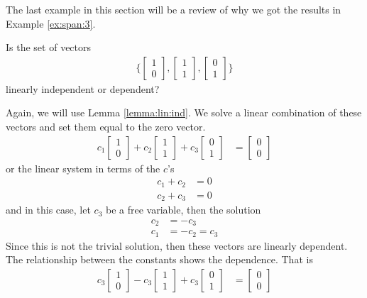 The last example in this section will be a review of why we got the results in Example \ref{ex:span:3}. 

\begin{example}
Is the set of vectors 
\begin{align*}
 \biggl\{ \begin{bmatrix}
1 \\ 0 
\end{bmatrix}, \begin{bmatrix}
1 \\ 1
\end{bmatrix}, \begin{bmatrix}
0 \\1 
\end{bmatrix} \biggr\}
\end{align*}
linearly independent or dependent?

\solution

Again, we will use Lemma \ref{lemma:lin:ind}.  We solve a linear combination of these vectors and set them equal to the zero vector.  
%
\begin{align*}
c_1\begin{bmatrix}
1 \\ 0 
\end{bmatrix}+c_2 \begin{bmatrix}
1 \\ 1
\end{bmatrix}+c_3 \begin{bmatrix}
0 \\1 
\end{bmatrix} & = \begin{bmatrix}
0 \\ 0 
\end{bmatrix}
\end{align*}
or the linear system in terms of the $c$'s
%
\begin{align*}
c_1 + c_2 & = 0 \\
c_2 + c_3 & = 0 
\end{align*}
and in this case, let $c_3$ be a free variable, then the solution
%
\begin{align*}
c_2 & = -c_3 \\
c_1 & = -c_2 = c_3 
\end{align*}
Since this is not the trivial solution, then these vectors are linearly dependent.  The relationship between the constants shows the dependence.  That is 
%
\begin{align*}
c_3\begin{bmatrix}
1 \\ 0 
\end{bmatrix}-c_3 \begin{bmatrix}
1 \\ 1
\end{bmatrix}+c_3 \begin{bmatrix}
0 \\1 
\end{bmatrix} & = \begin{bmatrix}
0 \\ 0 
\end{bmatrix}
\end{align*}


\end{example}
